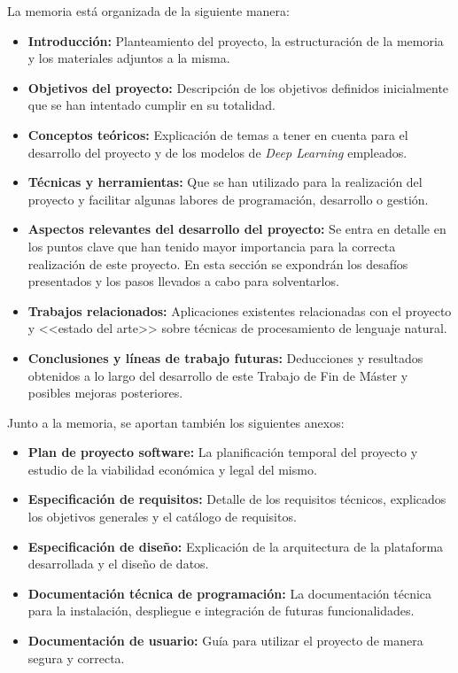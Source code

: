 La memoria está organizada de la siguiente manera:

\begin{itemize}
    \item \textbf{Introducción:} Planteamiento del proyecto, la estructuración de la memoria y los materiales adjuntos a la misma.
    \item \textbf{Objetivos del proyecto:} Descripción de los objetivos definidos inicialmente que se han intentado cumplir en su totalidad.
    \item \textbf{Conceptos teóricos:} Explicación de temas a tener en cuenta para el desarrollo del proyecto y de los modelos de \textit{Deep Learning} empleados.
    \item \textbf{Técnicas y herramientas:} Que se han utilizado para la realización del proyecto y facilitar algunas labores de programación, desarrollo o gestión.
    \item \textbf{Aspectos relevantes del desarrollo del proyecto:} Se entra en detalle en los puntos clave que han tenido mayor importancia para la correcta realización de este proyecto. En esta sección se expondrán los desafíos presentados y los pasos llevados a cabo para solventarlos.
    \item \textbf{Trabajos relacionados:} Aplicaciones existentes relacionadas con el proyecto y <<estado del arte>> sobre técnicas de procesamiento de lenguaje natural.
    \item \textbf{Conclusiones y líneas de trabajo futuras:} Deducciones y resultados obtenidos a lo largo del desarrollo de este Trabajo de Fin de Máster y posibles mejoras posteriores.
\end{itemize}

Junto a la memoria, se aportan también los siguientes anexos:

\begin{itemize}
    \item \textbf{Plan de proyecto software:} La planificación temporal del proyecto y estudio de la viabilidad económica y legal del mismo.
    \item \textbf{Especificación de requisitos:} Detalle de los requisitos técnicos, explicados los objetivos generales y el catálogo de requisitos.
    \item \textbf{Especificación de diseño:} Explicación de la arquitectura de la plataforma desarrollada y el diseño de datos.
    \item \textbf{Documentación técnica de programación:} La documentación técnica para la instalación, despliegue e integración de futuras funcionalidades.
    \item \textbf{Documentación de usuario:} Guía para utilizar el proyecto de manera segura y correcta.
\end{itemize}

